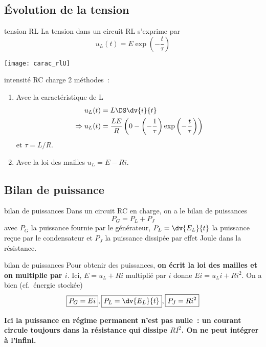 \documentclass[../main/main.tex]{subfiles}
\begin{document}
\subsection{Évolution de la tension}
\begin{tcbraster}[raster columns=2, raster equal height=rows]
    \begin{prop}[label=prop:irc-charge, sidebyside, righthand ratio=.45]{tension RL}
        La tension dans un circuit RL s'exprime par
        \[\boxed{u_L(t) = E\exp \left(-\frac{t}{\tau} \right)}\]
        \tcblower
        \begin{center}
            \hspace*{-12pt}\texttt{[image: carac\_rlU]}
        \end{center}
    \end{prop}
    \begin{demo}[label=demo:irc-charge]{intensité RC charge}
        2 méthodes~:
        \begin{enumerate}
            \item Avec la caractéristique de L
                \begin{align*}
                                u_L(t) &= L\DS \dv{i}{t}\\
                    \Rightarrow u_L(t) &= \frac{LE}{R} \left(0 -
                        \left(-\frac{1}{\tau} \right)
                        \exp \left(- \frac{t}{\tau} \right) \right)
                \end{align*}
                et $\tau = L/R$.
            \item Avec la loi des mailles $u_L = E - Ri$.
        \end{enumerate}
    \end{demo}
\end{tcbraster}

\subsection{Bilan de puissance}

\begin{tcbraster}[raster columns=2, raster equal height=rows]
    \begin{prop}[label=prop:rcpuiss-charge]{bilan de puissances}
        Dans un circuit RC en charge, on a le bilan de puissances
        \[ \boxed{P_G = P_L + P_J}\]
        avec $P_G$ la puissance fournie par le générateur, $P_L = \dv{E_L}{t}$
        la puissance reçue par le condensateur et $P_J$ la puissance dissipée
        par effet Joule dans la résistance.
    \end{prop}
    \begin{demo}[label=demo:rcpuiss-charge]{bilan de puissances}
        Pour obtenir des puissances, \textbf{on écrit la loi des mailles et on
        multiplie par $i$}. Ici, $E = u_L + Ri$ multiplié par $i$ donne $Ei =
        u_Li + Ri^2$. On a bien (cf.\ énergie stockée)
        \[\boxed{P_G = Ei}, \boxed{P_L = \dv{E_L}{t}}, \boxed{P_J=Ri^2}\]
    \end{demo}
\end{tcbraster}
\textbf{Ici la puissance en régime permanent n'est pas nulle~: un courant circule
toujours dans la résistance qui dissipe $RI^2$. On ne peut intégrer à l'infini.}
\end{document}
